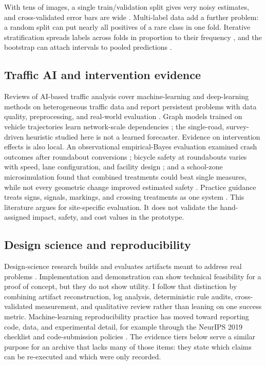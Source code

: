 \documentclass[11pt]{article}
\begin{document}
With tens of images, a single train/validation split gives very noisy estimates, and cross-validated error bars are wide \citep{varoquaux2018}. Multi-label data add a further problem: a random split can put nearly all positives of a rare class in one fold. Iterative stratification spreads labels across folds in proportion to their frequency \citep{sechidis2011}, and the bootstrap can attach intervals to pooled predictions \citep{efron1993}.

\subsection{Traffic AI and intervention evidence}
Reviews of AI-based traffic analysis cover machine-learning and deep-learning methods on heterogeneous traffic data and report persistent problems with data quality, preprocessing, and real-world evaluation \citep{sayed2023,shaygan2022}. Graph models trained on vehicle trajectories learn network-scale dependencies \citep{li2021}; the single-road, survey-driven heuristic studied here is not a learned forecaster. Evidence on intervention effects is also local. An observational empirical-Bayes evaluation examined crash outcomes after roundabout conversions \citep{gross2013}; bicycle safety at roundabouts varies with speed, lane configuration, and facility design \citep{poudel2021}; and a school-zone microsimulation found that combined treatments could beat single measures, while not every geometric change improved estimated safety \citep{rahman2019}. Practice guidance treats signs, signals, markings, and crossing treatments as one system \citep{fhwa2015,ite2012}. This literature argues for site-specific evaluation. It does not validate the hand-assigned impact, safety, and cost values in the prototype.

\subsection{Design science and reproducibility}
Design-science research builds and evaluates artifacts meant to address real problems \citep{hevner2004}. Implementation and demonstration can show technical feasibility for a proof of concept, but they do not show utility. I follow that distinction by combining artifact reconstruction, log analysis, deterministic rule audits, cross-validated measurement, and qualitative review rather than leaning on one success metric. Machine-learning reproducibility practice has moved toward reporting code, data, and experimental detail, for example through the NeurIPS 2019 checklist and code-submission policies \citep{pineau2021}. The evidence tiers below serve a similar purpose for an archive that lacks many of those items: they state which claims can be re-executed and which were only recorded.
\end{document}
